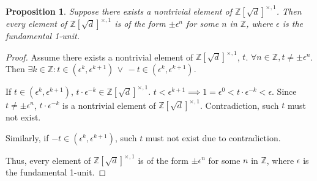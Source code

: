 \documentclass{article}
\newtheorem*{thm}{Proposition}
\theoremstyle{definition}\newtheorem{definition}{Definition}
\begin{document}
\begin{thm}
	Suppose there exists a nontrivial element of $\mathbb { Z } [ \sqrt { d } ] ^ { \times , 1 }$.
	Then every element of $\mathbb { Z } [ \sqrt { d } ] ^ { \times , 1 }$ is of the form $\pm \epsilon ^ { n }$ for some $n$ in $\mathbb { Z }$, where $\epsilon$ is the fundamental 1-unit.
\end{thm}	

\begin{proof}
	Assume there exists a nontrivial element of $\mathbb { Z } [ \sqrt { d } ] ^ { \times , 1 }$, $t$. $\forall n \in \mathbb {Z}, t \neq \pm \epsilon ^ { n } $. Then $\exists k \in \mathbb { Z } : t \in (\epsilon^k,\epsilon^{k+1}) \, \lor \, -t \in (\epsilon^k,\epsilon^{k+1})$.
	
	If $t \in (\epsilon^k,\epsilon^{k+1})$, $t\cdot \epsilon^{-k} \in \mathbb { Z } [ \sqrt { d } ] ^ { \times , 1 }$. $t<\epsilon^{k+1} \implies 1=\epsilon^{0}<t\cdot \epsilon^{-k} < \epsilon$. Since $t \neq \pm \epsilon ^ { n } $, $t\cdot \epsilon^{-k}$ is a nontrivial element of $\mathbb { Z } [ \sqrt { d } ] ^ { \times , 1 }$. Contradiction, such $t$ must not exist.
	
	Similarly, if $-t \in (\epsilon^k,\epsilon^{k+1})$, such $t$ must not exist due to contradiction.
	
	Thus, every element of $\mathbb { Z } [ \sqrt { d } ] ^ { \times , 1 }$ is of the form $\pm \epsilon ^ { n }$ for some $n$ in $\mathbb { Z }$, where $\epsilon$ is the fundamental 1-unit.
\end{proof}		
\end{document}
